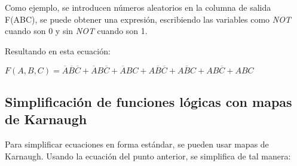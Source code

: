 \documentclass[12pt]{article}
\begin{document}
            \begin{table}[H]
            \centering
            \caption{Tabla de verdad de la ecuación propuesta}
            \label{tab:verdad}
            \end{table}
            Como ejemplo, se introducen números aleatorios en la columna de salida F(ABC), se puede obtener una expresión, escribiendo las variables como \textit{NOT} cuando son 0 y sin \textit{NOT} cuando son 1. 
            
            Resultando en esta ecuación:
            
            $F(A,B,C) = \overline{A}\overline{B}\overline{C} + \overline{A}B\overline{C} + \overline{A}BC + A\overline{B}\overline{C} + A\overline{B}C + AB\overline{C} + ABC$
        \newpage
        \subsection{Simplificación de funciones lógicas con mapas de Karnaugh \cite{video_karnaugh}}
            Para simplificar ecuaciones en forma estándar, se pueden usar mapas de Karnaugh. Usando la ecuación del punto anterior, se simplifica de tal manera:
\end{document}
